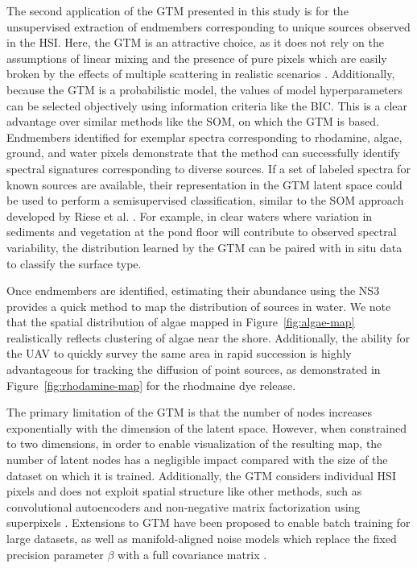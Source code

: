 The second application of the GTM presented in this study is for the
unsupervised extraction of endmembers corresponding to unique sources observed
in the HSI. Here, the GTM is an attractive choice, as it does not rely on the
assumptions of linear mixing and the presence of pure pixels which are easily
broken by the effects of multiple scattering in realistic scenarios
\cite{nonlinearity-in-hsi}. Additionally, because the GTM is a probabilistic
model, the values of model hyperparameters can be selected objectively using
information criteria like the BIC. This is a clear advantage over similar
methods like the SOM, on which the GTM is based. Endmembers identified for
exemplar spectra corresponding to rhodamine, algae, ground, and water pixels
demonstrate that the method can successfully identify spectral signatures
corresponding to diverse sources. If a set of labeled spectra for known sources
are available, their representation in the GTM latent space could be used to
perform a semisupervised classification, similar to the SOM approach developed
by Riese et al. \cite{riese2019supervised}. For example, in clear waters where
variation in sediments and vegetation at the pond floor will contribute to
observed spectral variability, the distribution learned by the GTM can be paired
with in situ data to classify the surface type.

Once endmembers are identified, estimating their abundance using the NS3
provides a quick method to map the distribution of sources in water. We note
that the spatial distribution of algae mapped in Figure~\ref{fig:algae-map}
realistically reflects clustering of algae near the shore. Additionally, the
ability for the UAV to quickly survey the same area in rapid succession is
highly advantageous for tracking the diffusion of point sources, as demonstrated
in Figure~\ref{fig:rhodamine-map} for the rhodmaine dye release.

The primary limitation of the GTM is that the number of nodes increases
exponentially with the dimension of the latent space. However, when constrained
to two dimensions, in order to enable visualization of the resulting map, the
number of latent nodes has a negligible impact compared with the size of the
dataset on which it is trained. Additionally, the GTM considers individual HSI
pixels and does not exploit spatial structure like other methods, such as
convolutional autoencoders and non-negative matrix factorization using
superpixels \cite{palsson2020convolutional,unmixing-nmf-review}. Extensions
to  GTM have been proposed to enable batch training for large datasets, as well
as manifold-aligned noise models which replace the fixed precision parameter
$\beta$ with a full covariance matrix \cite{gtm-developments}.

